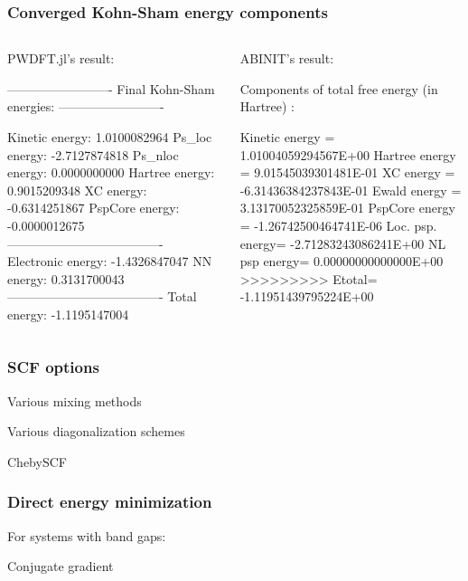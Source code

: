 \documentclass[english,9pt]{beamer}
\begin{document}
\begin{frame}[fragile]
\frametitle{Converged Kohn-Sham energy components}

\begin{columns}

\begin{column}{0.45\textwidth}
PWDFT.jl's result:
\begin{textcode}
-------------------------
Final Kohn-Sham energies:
-------------------------

Kinetic    energy:       1.0100082964
Ps_loc     energy:      -2.7127874818
Ps_nloc    energy:       0.0000000000
Hartree    energy:       0.9015209348
XC         energy:      -0.6314251867
PspCore    energy:      -0.0000012675
-------------------------------------
Electronic energy:      -1.4326847047
NN         energy:       0.3131700043
-------------------------------------
Total      energy:      -1.1195147004
\end{textcode}
\end{column}

\begin{column}{0.55\textwidth}

ABINIT's result:
\begin{textcode}
Components of total free energy (in Hartree) :

   Kinetic energy  =  1.01004059294567E+00
   Hartree energy  =  9.01545039301481E-01
   XC energy       = -6.31436384237843E-01
   Ewald energy    =  3.13170052325859E-01
   PspCore energy  = -1.26742500464741E-06
   Loc. psp. energy= -2.71283243086241E+00
   NL   psp  energy=  0.00000000000000E+00
   >>>>>>>>> Etotal= -1.11951439795224E+00
\end{textcode}
\end{column}

\end{columns}

\end{frame}


\begin{frame}
\frametitle{SCF options}

Various mixing methods

Various diagonalization schemes

ChebySCF

\end{frame}


\begin{frame}
\frametitle{Direct energy minimization}

For systems with band gaps:

Conjugate gradient

\end{frame}
\end{document}

